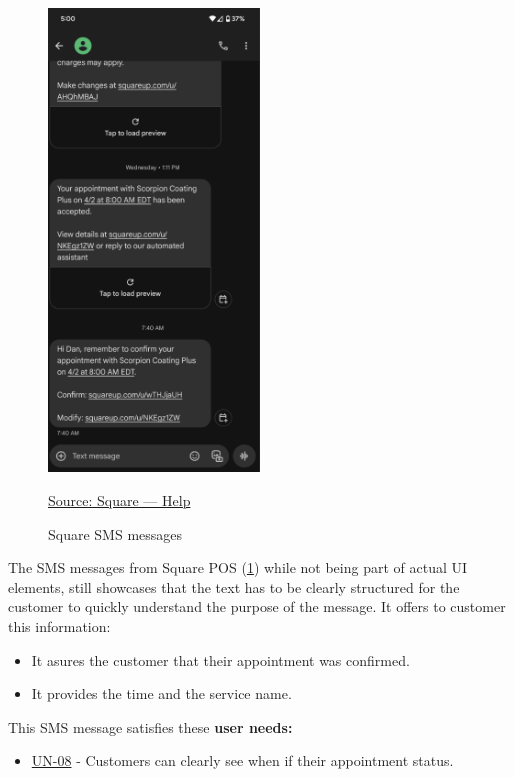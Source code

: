 \documentclass[]{VUMIFTemplateClass}
\begin{document}
\begin{figure}[H]
    \centering
    \includegraphics[width=0.5\textwidth]{images/examples/square_SMS.png}
    \caption{Square SMS messages}
    \href{https://squareup.com/help/us/en}{Source: Square — Help}
    \label{fig:square-sms}
\end{figure}

The SMS messages from Square POS (\ref{fig:square-sms}) while not being part of actual UI elements, still showcases that the text has to be clearly structured for the customer to quickly understand the purpose of the message. It offers to customer this information:

\begin{itemize}
    \item It asures the customer that their appointment was confirmed.
    \item It provides the time and the service name.
\end{itemize}


This SMS message satisfies these \textbf{user needs:}

\begin{itemize}
    \item \hyperref[UN-08]{UN-08} - Customers can clearly see when if their appointment status.
\end{itemize}
\end{document}
